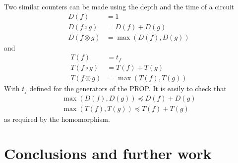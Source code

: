 \documentclass[a4paper]{article}
\begin{document}
\begin{example}
  Two similar counters can be made using the depth and the time of a circuit
  \begin{align*}
    D(f) &= 1 \\
    D(f \circ g) &= D(f) + D(g) \\
    D(f \otimes g) &= \max(D(f), D(g))
  \end{align*}
  and
  \begin{align*}
    T(f) &= t_f \\
    T(f \circ g) &= T(f) + T(g) \\
    T(f \otimes g) &= \max(T(f), T(g))
  \end{align*}
  With $t_f$ defined for the generators of the PROP.
  It is easily to check that
  \begin{align*}
    \max(D(f), D(g)) \preceq D(f) + D(g) \\
    \max(T(f), T(g)) \preceq T(f) + T(g)
  \end{align*}
  as required by the homomorphism.
\end{example}

\section{Conclusions and further work}
\label{sec:conclusion}



\small

\end{document}
